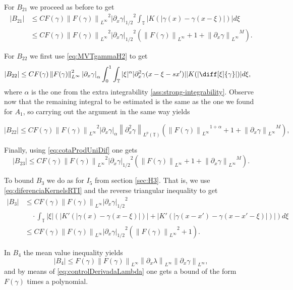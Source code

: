 \documentclass[a4paper]{amsart}
\theoremstyle{definition}
\newcommand{\T}{\ensuremath{\mathbb{T}}}
\newcommand{\SNa}[2][\gamma]{\ensuremath{\left|#2\right|_{#1}}}
\newcommand{\Np}[2][\infty]{\ensuremath{\left\|#2\right\|_{L^#1}}}
\newcommand{\Lp}[2][2]{\ensuremath{\left\|#2\right\|_{L^#1(\T)}}}
\newcommand{\intT}{\ensuremath{\int_\T}}
\begin{document}
        For $B_{21}$ we proceed as before to get
        \begin{align*}
            |B_{21}|&\leq C F(\gamma) \Np{F(\gamma)}^2 \SNa[1/2]{\partial_x \gamma}^2 \intT |K(|\gamma(x)-\gamma(x-\xi)|)| d\xi\\ &\leq C F(\gamma) \Np{F(\gamma)}^2 \SNa[1/2]{\partial_x \gamma}^2 \left( \Np{F(\gamma)} + 1 + \Np{\partial_x\gamma}^M \right).
        \end{align*}

        For $B_{22}$ we first use \eqref{eq:MVTgammaH2} to get 
        \begin{align*}
            |B_{22}|&\leq C F(\gamma) \Np{F(\gamma)}^2 \SNa[\alpha]{\partial_x \gamma} \int_0^1\intT |\xi|^{\alpha}|\partial_x^2\gamma(x-\xi-sx')| |K(|\diff[\xi]{\gamma}|)|d\xi, 
        \end{align*}
        where $\alpha$ is the one from the extra integrability  \eqref{ass:strong-integrability}. Observe now that the remaining integral to be estimated is the same as the one we found for $A_1$, so carrying out the argument in the same way yields

        $$|B_{22}|\leq C F(\gamma) \Np{F(\gamma)}^2 \SNa[\alpha]{\partial_x \gamma} \Lp[p]{\partial_x^2 \gamma} (\Np{F(\gamma)}^{1+\alpha}+1+\Np{\partial_x\gamma}^M),$$

        Finally, using \eqref{eq:cotaProdUniDif} one gets 
        $$ |B_{23}|\leq C F(\gamma) \Np{F(\gamma)}^2 \SNa[1/2]{\partial_x \gamma}^2 \left( \Np{F(\gamma)} + 1 + \Np{\partial_x\gamma}^M \right).$$

        To bound $B_3$ we do as for $I_5$ from section \ref{sec:H3}. That is, we use \eqref{eq:diferenciaKernelsRTI} and the reverse triangular inequality to get 
        \begin{align*}
            |B_3|&\leq C F(\gamma) \Np{F(\gamma)} \SNa[1/2]{\partial_x\gamma}^2 \\&\quad  \cdot\intT |\xi|(|K'(|\gamma(x)-\gamma(x-\xi)|)|+|K'(|\gamma(x-x')-\gamma(x-x'-\xi)|)|) d\xi\\
            &\leq  C F(\gamma) \Np{F(\gamma)} \SNa[1/2]{\partial_x\gamma}^2 (\Np{F(\gamma)}^2+1).
        \end{align*}

        In $B_4$ the mean value inequality yields 
        $$|B_4|\leq F(\gamma) \Np{F(\gamma)} \Np{\partial_x\lambda} \Np{\partial_x\gamma},$$
        and by means of \eqref{eq:controlDerivadaLambda} one gets a bound of the form $F(\gamma)$ times a polynomial. 
\end{document}
